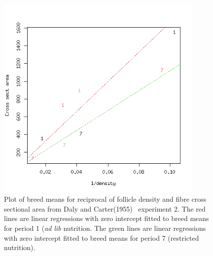 %

\begin{figure}[h]
  \centering
   \includegraphics[width=0.9\textwidth]{DC1955/expt2reg.png}
  \caption{Plot of breed means for reciprocal of follicle density and fibre cross sectional area from Daly and Carter(1955)~\cite{daly:55} experiment 2.  The red lines are linear regressions  with zero intercept fitted to breed means for period 1 ({\em ad lib} nutrition. The green lines are linear regressions with zero intercept fitted to breed means for period 7 (restricted nutrition).}
  \label{fig:dcexpt2reg}
\end{figure}

%

